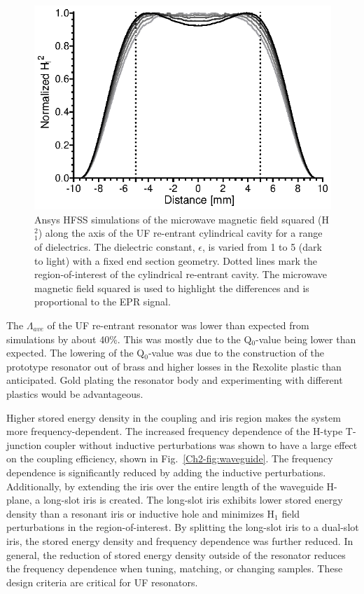 \begin{figure}[htb]\centering
 \includegraphics{Kapitel/Ch2-Images/07-TE01UdielectircA.eps}
 \caption[Ansys HFSS simulations of with varying samples.]{Ansys HFSS simulations of the microwave magnetic field squared (H$^2_1$) along the axis of the UF re-entrant cylindrical \cylTE{} cavity for a range of dielectrics. The dielectric constant, $\epsilon$, is varied from 1 to 5 (dark to light) with a fixed end section geometry. Dotted lines mark the region-of-interest of the cylindrical re-entrant \cylTE{} cavity.  The microwave magnetic field squared is used to highlight the differences and is proportional to the EPR signal. }
 \label{Ch2-fig:dielectric}
\end{figure}

The $\Lambda_{ave}$ of the UF re-entrant \cylTE{} resonator was lower than expected from simulations by about 40\%. This was mostly due to the Q$_0$-value being lower than expected. The lowering of the Q$_0$-value was due to the construction of the prototype resonator out of brass and higher losses in the Rexolite plastic than anticipated. Gold plating the resonator body and experimenting with different plastics would be advantageous. 

Higher stored energy density in the coupling and iris region makes the system more frequency-dependent. The increased frequency dependence of the H-type T-junction coupler without inductive perturbations was shown to have a large effect on the coupling efficiency, shown in Fig.~\ref{Ch2-fig:waveguide}. The frequency dependence is significantly reduced by adding the inductive perturbations. Additionally, by extending the iris over the entire length of the waveguide H-plane, a long-slot iris is created. \cite{Mett2009} The long-slot iris exhibits lower stored energy density than a resonant iris or inductive hole and minimizes H$_1$ field perturbations in the region-of-interest. By splitting the long-slot iris to a dual-slot iris, the stored energy density and frequency dependence was further reduced. In general, the reduction of stored energy density outside of the resonator reduces the frequency dependence when tuning, matching, or changing samples. These design criteria are critical for UF resonators. 

